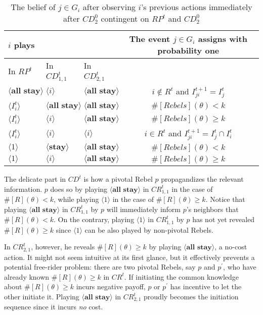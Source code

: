 \documentclass[12pt,letter]{article}
\theoremstyle{definition}
\theoremstyle{remark}
\theoremstyle{claim}
\begin{document}
\begin{table}[!htbp]
\caption{The belief of $j\in G_i$ after observing $i$'s previous actions immediately after $CD^0_{2}$ {contingent} on $RP^t$ and $CD^0_{2}$ }
\label{Table_blf_up_cdt2}
\begin{center}
\begin{tabular}{l  l l | c}
 $i$ plays  	&		&  	  &The event $j\in G_i$ assigns with probability one\\
\hline
\hline
In $RP^t$			&	In $CD^t_{1,1}$			&			In $CD^t_{2,1}$		&   \\
\hline
$\langle \textbf{all stay} \rangle$  & $\langle i \rangle$	&  $\langle \textbf{all stay} \rangle$ &  $i\notin R^t$ and $I^{t+1}_{ji}=I^t_j$  \\
$\langle I^t_{i} \rangle$  & $\langle \textbf{all stay} \rangle$	&  $\langle \textbf{all stay} \rangle$ &  $\#[Rebels](\theta)< k$ \\
$\langle I^t_{i} \rangle$  & $\langle i \rangle$	&  $\langle \textbf{all stay} \rangle$ &  $\#[Rebels](\theta)\geq k$ \\
$\langle I^t_{i} \rangle$  & $\langle i \rangle$	&  $\langle i \rangle$ &  $i\in R^t$ and $I^{t+1}_{ji}=I^t_j\cap I^t_{i}$ \\
$\langle 1 \rangle$  & $\langle \textbf{stay} \rangle$	&	$\langle \textbf{all stay} \rangle$ &  $\#[Rebels](\theta)< k$    \\
$\langle 1 \rangle$  & $\langle i \rangle$	&	$\langle \textbf{all stay} \rangle$ &  $\#[Rebels](\theta)\geq k$  \\
  \hline
\end{tabular}
\end{center}
\end{table}

\clearpage

The delicate part in $CD^t$ is how a pivotal Rebel $p$ propagandizes the relevant information. $p$ does so by playing $\langle \textbf{all stay} \rangle$ in $CR^{t}_{1,1}$ in the case of $\#[R](\theta)< k$, while playing $\langle 1 \rangle$ in the case of $\#[R](\theta)\geq k$. Notice that playing $\langle \textbf{all stay} \rangle$ in $CR^{t}_{1,1}$ by $p$ will immediately inform $p$'s neighbors that $\#[R](\theta)< k$. On the contrary, playing $\langle 1 \rangle$ in $CR^{t}_{1,1}$ by $p$ has not yet revealed $\#[R](\theta)\geq k$ since $\langle 1 \rangle$ can be also played by non-pivotal Rebels. 

In $CR^{t}_{2,1}$, however, he reveals $\#[R](\theta)\geq k$ by playing $\langle \textbf{all stay} \rangle$, a no-cost action. It might not seem intuitive at its first glance, but it effectively prevents a potential free-rider problem: there are two pivotal Rebels, say $p$ and $p^{'}$, who have already known $\#[R](\theta)\geq k$ in $CR^t$. If initiating the common knowledge about $\#[R](\theta)\geq k$ incurs negative payoff, $p$ or $p^{'}$ has incentive to let the other initiate it. Playing $\langle \textbf{all stay} \rangle$ in $CR^t_{2,1}$ proudly becomes the initiation sequence since it incurs \textit{no} cost.
\end{document}
